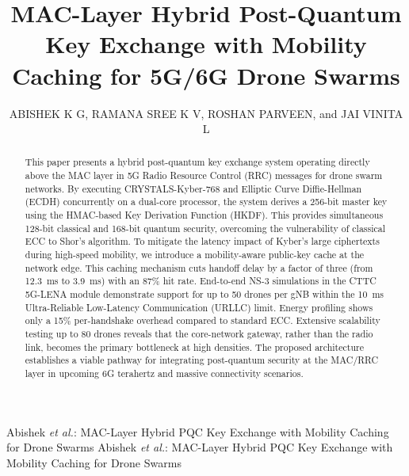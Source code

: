 \documentclass{ieeeaccess}
\begin{document}

\title{MAC-Layer Hybrid Post-Quantum Key Exchange with Mobility Caching for 5G/6G Drone Swarms}

\author{%
  \uppercase{Abishek K G},
  \uppercase{Ramana Sree K V},
  \uppercase{Roshan Parveen}, and
  \uppercase{Jai Vinita L}%
}

\address{School of Computer Science and Engineering, VIT Chennai, Tamil Nadu, India 600127 \\
E-mails: abishek.kg2023@vitstudent.ac.in, ramanasree.kv2023@vitstudent.ac.in, roshan.parveen2023@vitstudent.ac.in, jaivinita.l@vit.ac.in}



\markboth
{Abishek \textit{et al.}: MAC-Layer Hybrid PQC Key Exchange with Mobility Caching for Drone Swarms}
{Abishek \textit{et al.}: MAC-Layer Hybrid PQC Key Exchange with Mobility Caching for Drone Swarms}

\titlepgskip=-15pt

\begin{abstract}
This paper presents a hybrid post-quantum key exchange system operating directly above the MAC layer in 5G Radio Resource Control (RRC) messages for drone swarm networks. By executing CRYSTALS-Kyber-768 and Elliptic Curve Diffie-Hellman (ECDH) concurrently on a dual-core processor, the system derives a 256-bit master key using the HMAC-based Key Derivation Function (HKDF). This provides simultaneous 128-bit classical and 168-bit quantum security, overcoming the vulnerability of classical ECC to Shor's algorithm. To mitigate the latency impact of Kyber's large ciphertexts during high-speed mobility, we introduce a mobility-aware public-key cache at the network edge. This caching mechanism cuts handoff delay by a factor of three (from 12.3~ms to 3.9~ms) with an 87\% hit rate. End-to-end NS-3 simulations in the CTTC 5G-LENA module demonstrate support for up to 50 drones per gNB within the 10~ms Ultra-Reliable Low-Latency Communication (URLLC) limit. Energy profiling shows only a 15\% per-handshake overhead compared to standard ECC. Extensive scalability testing up to 80 drones reveals that the core-network gateway, rather than the radio link, becomes the primary bottleneck at high densities. The proposed architecture establishes a viable pathway for integrating post-quantum security at the MAC/RRC layer in upcoming 6G terahertz and massive connectivity scenarios.
\end{abstract}
\end{document}

